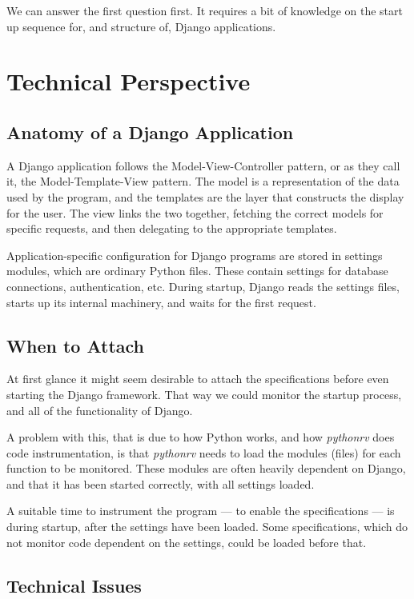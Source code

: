 \documentclass[a4paper,11pt]{kth-mag}
\theoremstyle{definition}
\begin{document}
We can answer the first question first. It requires a bit of knowledge on the
start up sequence for, and structure of, Django applications.


\section{Technical Perspective}


\subsection{Anatomy of a Django Application}

A Django application follows the Model-View-Controller pattern, or as they call
it, the Model-Template-View pattern. The model is a representation of the data
used by the program, and the templates are the layer that constructs the
display for the user. The view links the two together, fetching the correct
models for specific requests, and then delegating to the appropriate templates.

Application-specific configuration for Django programs are stored in settings
modules, which are ordinary Python files. These contain settings for database
connections, authentication, etc. During startup, Django reads the settings
files, starts up its internal machinery, and waits for the first request.


\subsection{When to Attach}

At first glance it might seem desirable to attach the specifications before
even starting the Django framework. That way we could monitor the startup
process, and all of the functionality of Django.

A problem with this, that is due to how Python works, and how \textit{pythonrv}
does code instrumentation, is that \textit{pythonrv} needs to load the modules
(files) for each function to be monitored. These modules are often heavily
dependent on Django, and that it has been started correctly, with all settings
loaded.

A suitable time to instrument the program --- to enable the specifications ---
is during startup, after the settings have been loaded. Some specifications,
which do not monitor code dependent on the settings, could be loaded before
that.


\subsection{Technical Issues}
\end{document}
